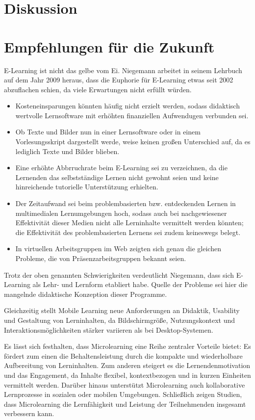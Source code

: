 \section{Diskussion}

\section{Empfehlungen für die Zukunft}
E-Learning ist nicht das gelbe vom Ei\label{elearning}. Niegemann arbeitet in seinem Lehrbuch auf dem Jahr 2009 heraus, dass die Euphorie für E-Learning etwas seit 2002 abzuflachen schien, da viele Erwartungen nicht erfüllt würden.\parencite[S.~14]{niegemann_kompendium_2008}

\begin{itemize}
	\item Kosteneinsparungen könnten häufig nicht erzielt werden, sodass didaktisch wertvolle Lernsoftware mit erhöhten finanziellen Aufwendugen verbunden sei.
	\item Ob Texte und Bilder nun in einer Lernsoftware oder in einem Vorlesungsskript dargestellt werde, weise keinen großen Unterschied auf, da es lediglich Texte und Bilder blieben.
	\item Eine erhöhte Abbrruchrate beim E-Learning sei zu verzeichnen, da die Lernenden das selbstständige Lernen nicht gewohnt seien und keine hinreichende tutorielle Unterstützung erhielten.
	\item Der Zeitaufwand sei beim problembasierten bzw. entdeckenden Lernen in multimedialen Lernumgebungen hoch, sodass auch bei nachgewiesener Effektivität dieser Medien nicht alle Lerninhalte vermittelt werden könnten; die Effektivität des problembasierten Lernens sei zudem keineswegs belegt.
	\item In virtuellen Arbeitsgruppen im Web zeigten sich genau die gleichen Probleme, die von Präsenzarbeitsgruppen bekannt seien.
\end{itemize}

Trotz der oben genannten Schwierigkeiten verdeutlicht Niegemann, dass sich E-Learning als Lehr- und Lernform etabliert habe. Quelle der Probleme sei hier die mangelnde didaktische Konzeption dieser Programme.\parencite[S.~14]{niegemann_kompendium_2008}

Gleichzeitig stellt Mobile Learning neue Anforderungen an Didaktik, Usability und Gestaltung von Lerninhalten, da Bildschirmgröße, Nutzungskontext und Interaktionsmöglichkeiten stärker variieren als bei Desktop-Systemen.

Es lässt sich festhalten, dass Microlearning eine Reihe zentraler Vorteile bietet: Es fördert zum einen die Behaltensleistung durch die kompakte und wiederholbare Aufbereitung von Lerninhalten. Zum anderen steigert es die Lernendenmotivation und das Engagement, da Inhalte flexibel, kontextbezogen und in kurzen Einheiten vermittelt werden. Darüber hinaus unterstützt Microlearning auch kollaborative Lernprozesse in sozialen oder mobilen Umgebungen. Schließlich zeigen Studien, dass Microlearning die Lernfähigkeit und Leistung der Teilnehmenden insgesamt verbessern kann.\parencite[S.~2]{leong_review_2021}
